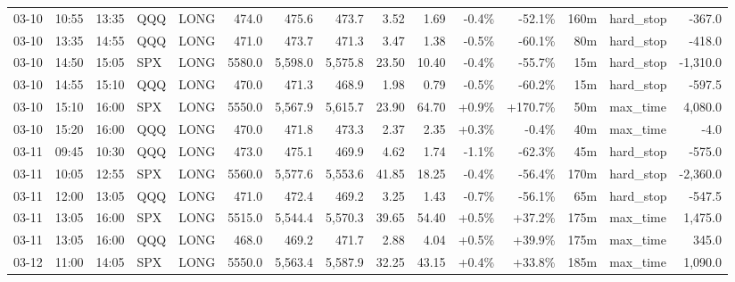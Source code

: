 \documentclass[11pt,a4paper,twoside]{article}
\begin{document}
\begin{landscape}
\begin{center}
\begin{longtable}{>{\color{txtmain}}l l l l l r r r r r r r r >{\color{txtmain}}l r}
03-10 & 10:55 & 13:35 & QQQ & LONG & 474.0 & 475.6 & 473.7 & 3.52 & 1.69 & \textcolor{lossred}{-0.4\%} & \textcolor{lossred}{-52.1\%} & 160m & hard\_stop & \textcolor{lossred}{-367.0} \\
03-10 & 13:35 & 14:55 & QQQ & LONG & 471.0 & 473.7 & 471.3 & 3.47 & 1.38 & \textcolor{lossred}{-0.5\%} & \textcolor{lossred}{-60.1\%} & 80m & hard\_stop & \textcolor{lossred}{-418.0} \\
03-10 & 14:50 & 15:05 & SPX & LONG & 5580.0 & 5,598.0 & 5,575.8 & 23.50 & 10.40 & \textcolor{lossred}{-0.4\%} & \textcolor{lossred}{-55.7\%} & 15m & hard\_stop & \textcolor{lossred}{-1,310.0} \\
03-10 & 14:55 & 15:10 & QQQ & LONG & 470.0 & 471.3 & 468.9 & 1.98 & 0.79 & \textcolor{lossred}{-0.5\%} & \textcolor{lossred}{-60.2\%} & 15m & hard\_stop & \textcolor{lossred}{-597.5} \\
03-10 & 15:10 & 16:00 & SPX & LONG & 5550.0 & 5,567.9 & 5,615.7 & 23.90 & 64.70 & \textcolor{wingreen}{+0.9\%} & \textcolor{wingreen}{+170.7\%} & 50m & max\_time & \textcolor{wingreen}{4,080.0} \\
03-10 & 15:20 & 16:00 & QQQ & LONG & 470.0 & 471.8 & 473.3 & 2.37 & 2.35 & \textcolor{wingreen}{+0.3\%} & \textcolor{lossred}{-0.4\%} & 40m & max\_time & \textcolor{lossred}{-4.0} \\
03-11 & 09:45 & 10:30 & QQQ & LONG & 473.0 & 475.1 & 469.9 & 4.62 & 1.74 & \textcolor{lossred}{-1.1\%} & \textcolor{lossred}{-62.3\%} & 45m & hard\_stop & \textcolor{lossred}{-575.0} \\
03-11 & 10:05 & 12:55 & SPX & LONG & 5560.0 & 5,577.6 & 5,553.6 & 41.85 & 18.25 & \textcolor{lossred}{-0.4\%} & \textcolor{lossred}{-56.4\%} & 170m & hard\_stop & \textcolor{lossred}{-2,360.0} \\
03-11 & 12:00 & 13:05 & QQQ & LONG & 471.0 & 472.4 & 469.2 & 3.25 & 1.43 & \textcolor{lossred}{-0.7\%} & \textcolor{lossred}{-56.1\%} & 65m & hard\_stop & \textcolor{lossred}{-547.5} \\
03-11 & 13:05 & 16:00 & SPX & LONG & 5515.0 & 5,544.4 & 5,570.3 & 39.65 & 54.40 & \textcolor{wingreen}{+0.5\%} & \textcolor{wingreen}{+37.2\%} & 175m & max\_time & \textcolor{wingreen}{1,475.0} \\
03-11 & 13:05 & 16:00 & QQQ & LONG & 468.0 & 469.2 & 471.7 & 2.88 & 4.04 & \textcolor{wingreen}{+0.5\%} & \textcolor{wingreen}{+39.9\%} & 175m & max\_time & \textcolor{wingreen}{345.0} \\
03-12 & 11:00 & 14:05 & SPX & LONG & 5550.0 & 5,563.4 & 5,587.9 & 32.25 & 43.15 & \textcolor{wingreen}{+0.4\%} & \textcolor{wingreen}{+33.8\%} & 185m & max\_time & \textcolor{wingreen}{1,090.0} \\

\end{longtable}
\end{center}
\end{landscape}
\end{document}
